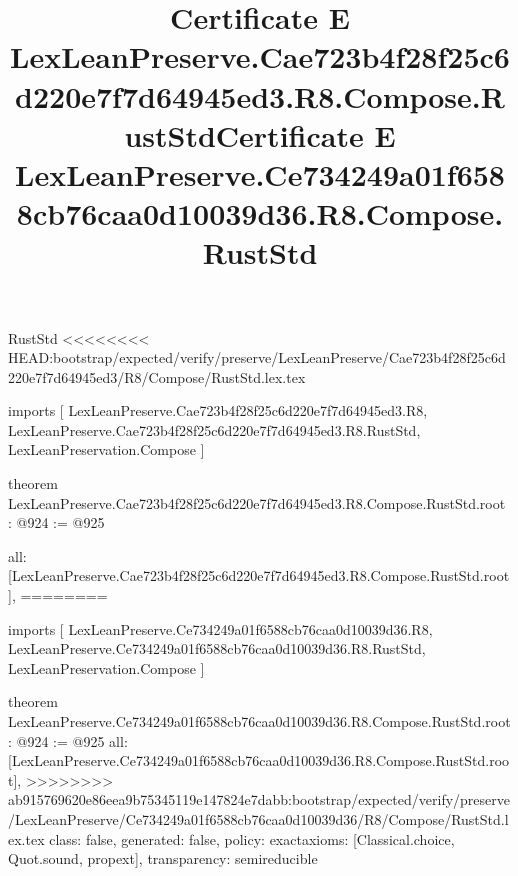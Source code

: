 \begin{lexlean}{RustStd}
<<<<<<<< HEAD:bootstrap/expected/verify/preserve/LexLeanPreserve/Cae723b4f28f25c6d220e7f7d64945ed3/R8/Compose/RustStd.lex.tex
\title{Certificate E LexLeanPreserve.Cae723b4f28f25c6d220e7f7d64945ed3.R8.Compose.RustStd}
\begin{coremodule}
imports [
  LexLeanPreserve.Cae723b4f28f25c6d220e7f7d64945ed3.R8,
  LexLeanPreserve.Cae723b4f28f25c6d220e7f7d64945ed3.R8.RustStd,
  LexLeanPreservation.Compose
]

theorem LexLeanPreserve.Cae723b4f28f25c6d220e7f7d64945ed3.R8.Compose.RustStd.root : @924 := @925 {
  all: [LexLeanPreserve.Cae723b4f28f25c6d220e7f7d64945ed3.R8.Compose.RustStd.root],
========
\title{Certificate E LexLeanPreserve.Ce734249a01f6588cb76caa0d10039d36.R8.Compose.RustStd}
\begin{coremodule}
imports [
  LexLeanPreserve.Ce734249a01f6588cb76caa0d10039d36.R8,
  LexLeanPreserve.Ce734249a01f6588cb76caa0d10039d36.R8.RustStd,
  LexLeanPreservation.Compose
]

theorem LexLeanPreserve.Ce734249a01f6588cb76caa0d10039d36.R8.Compose.RustStd.root : @924 := @925 {
  all: [LexLeanPreserve.Ce734249a01f6588cb76caa0d10039d36.R8.Compose.RustStd.root],
>>>>>>>> ab915769620e86eea9b75345119e147824e7dabb:bootstrap/expected/verify/preserve/LexLeanPreserve/Ce734249a01f6588cb76caa0d10039d36/R8/Compose/RustStd.lex.tex
  class: false,
  generated: false,
  policy: exact{axioms: [Classical.choice, Quot.sound, propext]},
  transparency: semireducible
}


\end{coremodule}}
\end{coremodule}
\end{lexlean}
